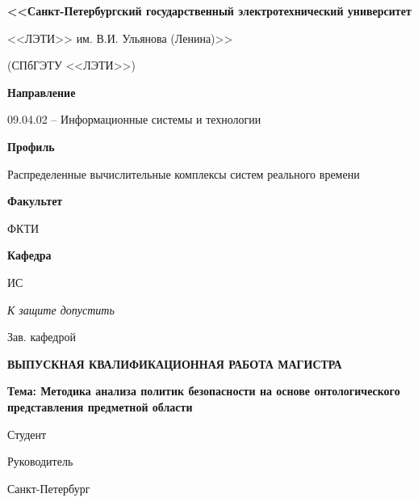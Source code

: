 \documentclass[../main]{subfiles}
\begin{document}
\begin{titlepage}
    \centering
    
    {\bfseries\small
        <<Санкт-Петербургский государственный электротехнический университет

        <<ЛЭТИ>> им. В.И. Ульянова (Ленина)>>
        
        (СПбГЭТУ <<ЛЭТИ>>)
    }

    \vspace{1cm}
    
    \textbf{Направление}\hfill\begin{minipage}[t]{12cm}
        09.04.02 -- Информационные системы и технологии
    \end{minipage}

    \textbf{Профиль}\hfill\begin{minipage}[t]{12cm}
        Распределенные вычислительные комплексы систем реального времени
    \end{minipage}\newline
    
    \textbf{Факультет}\hfill\begin{minipage}[t]{12cm}
        ФКТИ
    \end{minipage}
    
    \textbf{Кафедра}\hfill\begin{minipage}[t]{12cm}
        ИС
    \end{minipage}
    
    \vspace{1cm}

    \textit{К защите допустить}\hspace{\fill}
    
    Зав. кафедрой \hfill 
     
    
    \vspace{1cm}
    
    \MakeUppercase{\bfseries\large
        выпускная квалификационная работа магистра
    }

    {\bfseries
        Тема: Методика анализа политик безопасности на основе онтологического представления предметной области
    }

    \vfill
    
    Студент\hfill 
     
    
    \vspace{5mm}

    Руководитель\hfill
    \hfill
     

    \vspace{3cm}

    Санкт-Петербург\\
    \the\year
        
\end{titlepage}
\end{document}
